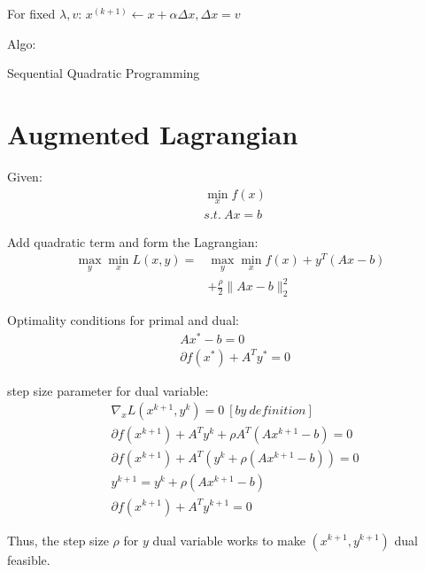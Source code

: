 \documentclass[8pt]{report}
\newcommand{\norm}[1]{\|#1\|}
\begin{document}
\begin{multicols*}{2}
  For fixed $\lambda, v$: $x^{(k+1)} \leftarrow x + \alpha \Delta x, \Delta x = v$
  
  Algo:\\
  \begin{algorithm}[H]
    \caption{Sequential Quadratic Programming\label{algo:SQP}}
  \end{algorithm}
  
  \vfill\null
  
  \pagebreak

  \section{Augmented Lagrangian}

  Given:
  \begin{align*}
    & \min_x f(x)\\
    & s.t.\ Ax = b
  \end{align*}

  Add quadratic term and form the Lagrangian:
  \begin{align*}
    \max_y \min_x L(x,y) = & \max_y \min_x f(x) + y^T(Ax-b)\\
                           & + \frac{\rho}{2}\norm{Ax-b}_2^2
  \end{align*}

  Optimality conditions for primal and dual:
  \begin{align*}
    & Ax^* - b = 0\\
    & \partial f(x^*) + A^Ty^* = 0
  \end{align*}

  step size parameter for dual variable:
  \begin{align*}
    &\nabla_x L(x^{k+1},y^k) = 0\ [by\ definition]\\
    &\partial f(x^{k+1}) + A^T y^k + \rho A^T(Ax^{k+1}-b)=0\\
    &\partial f(x^{k+1}) + A^T( y^k + \rho(Ax^{k+1}-b))=0\\
    &y^{k+1} = y^k + \rho(Ax^{k+1}-b)\\
    &\partial f(x^{k+1}) + A^T y^{k+1}=0
  \end{align*}

  Thus, the step size $\rho$ for $y$ dual variable works to make $(x^{k+1}, y^{k+1})$ dual feasible.


\end{multicols*}
\end{document}
